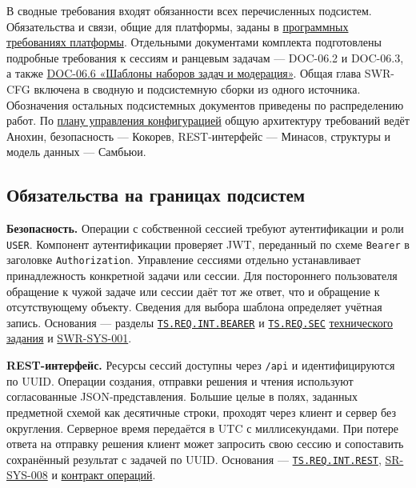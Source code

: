 \documentclass[12pt,a4paper]{article}
\begin{document}
В сводные требования входят обязанности всех перечисленных подсистем. Обязательства и связи, общие для платформы, заданы в {\hyperlink{doc-06-программные-требования-платформы}{программных требованиях платформы}}. Отдельными документами комплекта подготовлены подробные требования к сессиям и ранцевым задачам --- DOC-06.2 и DOC-06.3, а также {\href{DOC-06.6\_Конфигурации\_и\_модерация.pdf\#doc-066-шаблоны-наборов-задач-и-модерация}{DOC-06.6 «Шаблоны наборов задач и модерация»}}. Общая глава SWR-CFG включена в сводную и подсистемную сборки из одного источника. Обозначения остальных подсистемных документов приведены по распределению работ. По {\href{../03\_ПУКПО\_План\_управления\_конфигурацией/ПУКПО.pdf}{плану управления конфигурацией}} общую архитектуру требований ведёт Анохин, безопасность --- Кокорев, REST-интерфейс --- Минасов, структуры и модель данных --- Самбьюи.

\subsection{Обязательства на границах подсистем}\label{ux43eux431ux44fux437ux430ux442ux435ux43bux44cux441ux442ux432ux430-ux43dux430-ux433ux440ux430ux43dux438ux446ux430ux445-ux43fux43eux434ux441ux438ux441ux442ux435ux43c}

\hypertarget{обязательства-на-границах-подсистем}{}

\textbf{Безопасность.} Операции с собственной сессией требуют аутентификации и роли \texttt{USER}. Компонент аутентификации проверяет JWT, переданный по схеме \texttt{Bearer} в заголовке \texttt{Authorization}. Управление сессиями отдельно устанавливает принадлежность конкретной задачи или сессии. Для постороннего пользователя обращение к чужой задаче или сессии даёт тот же ответ, что и обращение к отсутствующему объекту. Сведения для выбора шаблона определяет учётная запись. Основания --- разделы {\href{../02\_Техническое\_задание/Техническое\_задание.pdf\#ts-req-int-bearer}{\texttt{TS.\allowbreak{}REQ.\allowbreak{}INT.\allowbreak{}BEARER}}} и {\href{../02\_Техническое\_задание/Техническое\_задание.pdf\#ts-req-sec}{\texttt{TS.REQ.SEC}}} {\href{../02\_Техническое\_задание/Техническое\_задание.pdf\#doc-02-техническое-задание}{технического задания}} и {\hyperlink{swr-sys-001}{SWR-SYS-001}}.

\textbf{REST-интерфейс.} Ресурсы сессий доступны через \texttt{/api} и идентифицируются по UUID. Операции создания, отправки решения и чтения используют согласованные JSON-представления. Большие целые в полях, заданных предметной схемой как десятичные строки, проходят через клиент и сервер без округления. Серверное время передаётся в UTC с миллисекундами. При потере ответа на отправку решения клиент может запросить свою сессию и сопоставить сохранённый результат с задачей по UUID. Основания --- {\href{../02\_Техническое\_задание/Техническое\_задание.pdf\#ts-req-int-rest}{\texttt{TS.\allowbreak{}REQ.\allowbreak{}INT.\allowbreak{}REST}}}, {\href{../04\_Системные\_требования/DOC-05\_Системные\_требования.pdf\#sr-sys-008}{SR-SYS-008}} и {\href{DOC-06.2\_Сессии\_задач\_и\_планировщик.pdf\#операции}{контракт операций}}.
\end{document}
